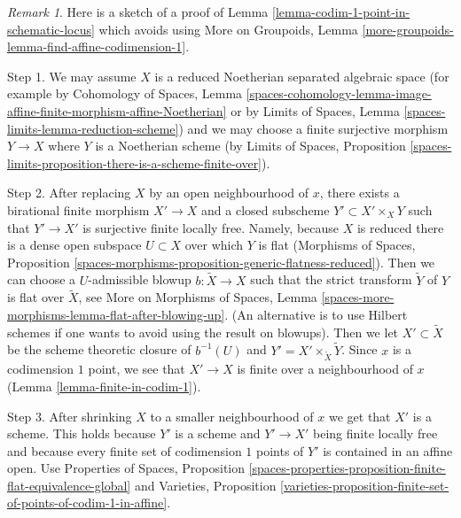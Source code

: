 \documentclass{stacks-project}
\theoremstyle{plain}
\theoremstyle{definition}
\theoremstyle{remark}
\newtheorem{remark}[subsection]{Remark}
\numberwithin{equation}{subsection}
\begin{document}
\begin{remark}
\label{remark-alternate-proof-scheme-codim-1}
Here is a sketch of a proof of
Lemma \ref{lemma-codim-1-point-in-schematic-locus}
which avoids using
More on Groupoids, Lemma
\ref{more-groupoids-lemma-find-affine-codimension-1}.

\medskip\noindent
Step 1. We may assume $X$ is a reduced Noetherian separated algebraic space
(for example by Cohomology of Spaces, Lemma
\ref{spaces-cohomology-lemma-image-affine-finite-morphism-affine-Noetherian}
or by
Limits of Spaces, Lemma \ref{spaces-limits-lemma-reduction-scheme})
and we may choose a finite surjective morphism
$Y \to X$ where $Y$ is a Noetherian scheme (by
Limits of Spaces, Proposition
\ref{spaces-limits-proposition-there-is-a-scheme-finite-over}).

\medskip\noindent
Step 2. After replacing $X$ by an open neighbourhood of $x$, there
exists a birational finite morphism $X' \to X$ and a closed subscheme
$Y' \subset X' \times_X Y$ such that $Y' \to X'$ is surjective
finite locally free. Namely, because $X$ is reduced there is a dense
open subspace $U \subset X$ over which $Y$ is flat (Morphisms of Spaces,
Proposition \ref{spaces-morphisms-proposition-generic-flatness-reduced}).
Then we can choose a $U$-admissible blowup $b : \tilde X \to X$ such
that the strict transform $\tilde Y$ of $Y$ is flat over $\tilde X$, see
More on Morphisms of Spaces, Lemma
\ref{spaces-more-morphisms-lemma-flat-after-blowing-up}.
(An alternative is to use Hilbert schemes if one wants to avoid using
the result on blowups).
Then we let $X' \subset \tilde X$ be the scheme theoretic
closure of $b^{-1}(U)$ and $Y' = X' \times_{\tilde X} \tilde Y$.
Since $x$ is a codimension $1$ point, we see that $X' \to X$ is finite over a
neighbourhood of $x$ (Lemma \ref{lemma-finite-in-codim-1}).

\medskip\noindent
Step 3. After shrinking $X$ to a smaller neighbourhood of $x$ we get that
$X'$ is a scheme. This holds because $Y'$ is a scheme and $Y' \to X'$
being finite locally free and because every finite set of codimension $1$
points of $Y'$ is contained in an affine open. Use
Properties of Spaces, Proposition
\ref{spaces-properties-proposition-finite-flat-equivalence-global}
and
Varieties, Proposition
\ref{varieties-proposition-finite-set-of-points-of-codim-1-in-affine}.


\end{remark}
\end{document}
